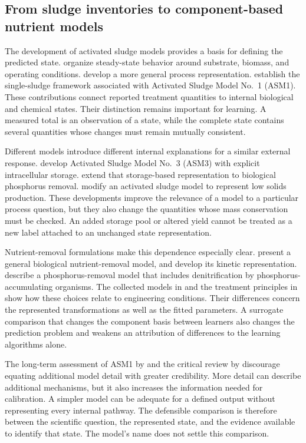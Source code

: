 \subsection{From sludge inventories to component-based nutrient models}

The development of activated sludge models provides a basis for defining the predicted state. \citet{Marais1976} organize steady-state behavior around substrate, biomass, and operating conditions. \citet{Dold1981} develop a more general process representation. \citet{Henze1987} establish the single-sludge framework associated with Activated Sludge Model No.\ 1 (ASM1). These contributions connect reported treatment quantities to internal biological and chemical states. Their distinction remains important for learning. A measured total is an observation of a state, while the complete state contains several quantities whose changes must remain mutually consistent.

Different models introduce different internal explanations for a similar external response. \citet{Gujer1999} develop Activated Sludge Model No.\ 3 (ASM3) with explicit intracellular storage. \citet{Rieger2001} extend that storage-based representation to biological phosphorus removal. \citet{Fall2015} modify an activated sludge model to represent low solids production. These developments improve the relevance of a model to a particular process question, but they also change the quantities whose mass conservation must be checked. An added storage pool or altered yield cannot be treated as a new label attached to an unchanged state representation.

Nutrient-removal formulations make this dependence especially clear. \citet{Barker1997} present a general biological nutrient-removal model, and \citet{Hu2007} develop its kinetic representation. \citet{Henze1999} describe a phosphorus-removal model that includes denitrification by phosphorus-accumulating organisms. The collected models in \citet{Henze2006} and the treatment principles in \citet{Henze2008} show how these choices relate to engineering conditions. Their differences concern the represented transformations as well as the fitted parameters. A surrogate comparison that changes the component basis between learners also changes the prediction problem and weakens an attribution of differences to the learning algorithms alone.

The long-term assessment of ASM1 by \citet{VanLoosdrecht2015} and the critical review by \citet{Hauduc2013} discourage equating additional model detail with greater credibility. More detail can describe additional mechanisms, but it also increases the information needed for calibration. A simpler model can be adequate for a defined output without representing every internal pathway. The defensible comparison is therefore between the scientific question, the represented state, and the evidence available to identify that state. The model's name does not settle this comparison.

